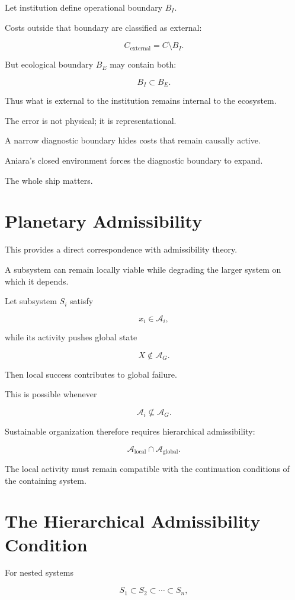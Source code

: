 \documentclass[11pt,oneside]{book}
\theoremstyle{definition}
\theoremstyle{remark}
\newcommand{\A}{\mathcal{A}}
\begin{document}
Let institution define operational boundary \(B_I\).

Costs outside that boundary are classified as external:

\[
C_{\mathrm{external}}
=
C\setminus B_I.
\]

But ecological boundary \(B_E\) may contain both:

\[
B_I\subset B_E.
\]

Thus what is external to the institution remains internal to the ecosystem.

The error is not physical; it is representational.

A narrow diagnostic boundary hides costs that remain causally active.

Aniara's closed environment forces the diagnostic boundary to expand.

The whole ship matters.

\section{Planetary Admissibility}

This provides a direct correspondence with admissibility theory.

A subsystem can remain locally viable while degrading the larger system on which it depends.

Let subsystem \(S_i\) satisfy

\[
x_i\in\A_i,
\]

while its activity pushes global state

\[
X\notin\A_G.
\]

Then local success contributes to global failure.

This is possible whenever

\[
\A_i
\not\subseteq
\A_G.
\]

Sustainable organization therefore requires hierarchical admissibility:

\[
\A_{\mathrm{local}}
\cap
\A_{\mathrm{global}}.
\]

The local activity must remain compatible with the continuation conditions of the containing system.

\section{The Hierarchical Admissibility Condition}

For nested systems

\[
S_1\subset S_2\subset\cdots\subset S_n,
\]
\end{document}
